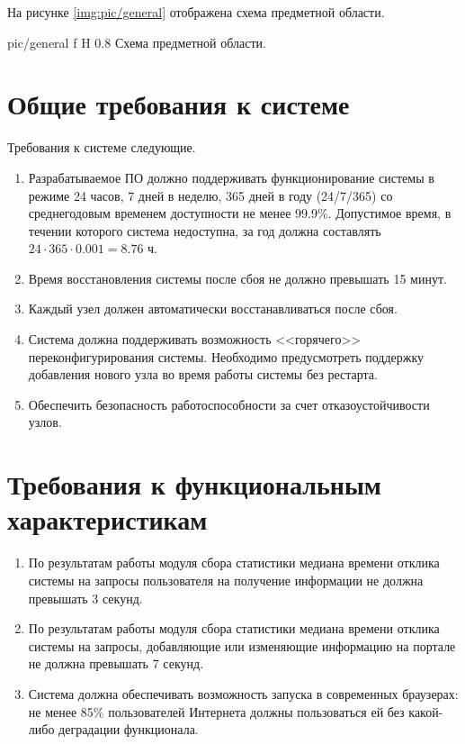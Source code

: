 На рисунке \ref{img:pic/general} отображена схема предметной области.

{pic/general}
{f}
{H}
{0.8\textwidth}
{Схема предметной области.}


\section{Общие требования к системе}
Требования к системе следующие.
\begin{enumerate}
	\item Разрабатываемое ПО должно поддерживать функционирование системы в режиме 24 часов, 7 дней в неделю, 365 дней в году (24/7/365) со среднегодовым временем доступности не менее 99.9\%. Допустимое время, в течении которого система недоступна, за год должна составлять $24\cdot365\cdot0.001=8.76$ ч.
	
	\item Время восстановления системы после сбоя не должно превышать 15 минут.
	
	\item Каждый узел должен автоматически восстанавливаться после сбоя.
	
	\item Система должна поддерживать возможность <<горячего>> переконфигурирования системы. Необходимо предусмотреть поддержку добавления нового узла во время работы системы без рестарта.
	
	\item Обеспечить безопасность работоспособности за счет отказоустойчивости узлов.
\end{enumerate}

\section{Требования к функциональным характеристикам}
\begin{enumerate}
	\item По результатам работы модуля сбора статистики медиана времени отклика системы на запросы пользователя на получение информации не должна превышать 3 секунд.
	
	\item По результатам работы модуля сбора статистики медиана времени отклика системы на запросы, добавляющие или изменяющие информацию на портале не должна превышать 7 секунд.
	
	\item Система должна обеспечивать возможность запуска в современных браузерах: не менее 85\% пользователей Интернета должны пользоваться ей без какой-либо деградации функционала.
\end{enumerate}

